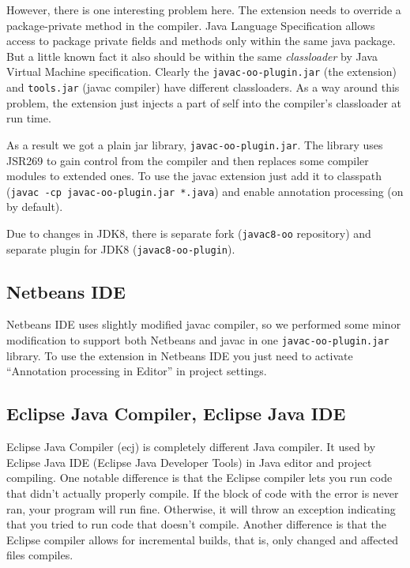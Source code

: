 \documentclass{aircc}
\begin{document}
However, there is one interesting problem\cite{soPackagePrivate} here.
The extension needs to override a package-private method in the compiler.
Java Language Specification\cite{jls} allows access to package private fields and methods only within the same java package.
But a little known fact it also should be within the same \textit{classloader} by Java Virtual Machine specification\cite{jvmspecPP}. 
Clearly the \texttt{javac-oo-plugin.jar} (the extension) and \texttt{tools.jar} (javac compiler) have different classloaders.
As a way around this problem, the extension just injects a part of self into the compiler's classloader at run time\cite{soPackagePrivate}.

As a result we got a plain jar library, \texttt{javac-oo-plugin.jar}.
The library uses JSR269 to gain control from the compiler and then replaces some compiler modules to extended ones.
To use the javac extension just add it to classpath (\texttt{javac -cp javac-oo-plugin.jar *.java}) and enable annotation processing (on by default).

Due to changes in JDK8, there is separate fork (\texttt{javac8-oo} repository) and separate plugin for JDK8 (\texttt{javac8-oo-plugin}).



\subsection{Netbeans IDE}

Netbeans IDE uses slightly modified javac compiler, 
so we performed some minor modification to support both Netbeans and javac in one \texttt{javac-oo-plugin.jar} library.
To use the extension in Netbeans IDE you just need to activate ``Annotation processing in Editor'' in project settings.

\subsection{Eclipse Java Compiler, Eclipse Java IDE}

Eclipse Java Compiler (ecj) is completely different Java compiler.
It used by Eclipse Java IDE (Eclipse Java Developer Tools) in Java editor and project compiling.
One notable difference is that the Eclipse compiler lets you run code that didn't actually properly compile. 
If the block of code with the error is never ran, your program will run fine. 
Otherwise, it will throw an exception indicating that you tried to run code that doesn't compile.
Another difference is that the Eclipse compiler allows for incremental builds, that is, only changed and affected files compiles.
\end{document}
